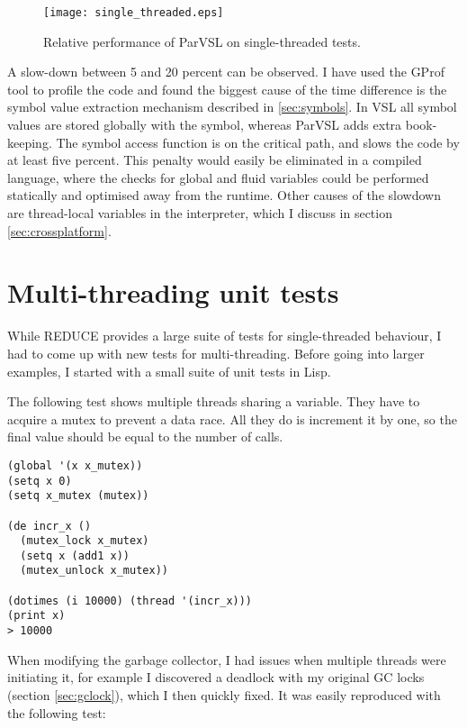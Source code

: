 \begin{figure}[h]
  \centering
  \texttt{[image: single\_threaded.eps]}
  \caption{Relative performance of ParVSL on single-threaded tests.}
  \label{fig:single-threaded}
\end{figure}


A slow-down between 5 and 20 percent can be observed. I have used the GProf \cite{gprof}
tool to profile the code and found the biggest cause of the time difference is the
symbol value extraction mechanism described in \ref{sec:symbols}. In VSL all symbol
values are stored globally with the symbol, whereas ParVSL adds extra book-keeping.
The symbol access function is on the critical path, and slows the code by at least
five percent. This penalty would easily be eliminated in a compiled language, where the
checks for global and fluid variables could be performed statically and optimised away
from the runtime. Other causes of the slowdown are thread-local variables in the interpreter,
which I discuss in section \ref{sec:crossplatform}.

\section{Multi-threading unit tests}

While REDUCE provides a large suite of tests for single-threaded behaviour, I had to come
up with new tests for multi-threading. Before going into larger examples, I started with a small
suite of unit tests in Lisp.

The following test shows multiple threads sharing a variable. They have to acquire
a mutex to prevent a data race. All they do is increment it by one, so the final
value should be equal to the number of calls.

\label{lst:shared-global}
\begin{verbatim}
(global '(x x_mutex))
(setq x 0)
(setq x_mutex (mutex))

(de incr_x ()
  (mutex_lock x_mutex)
  (setq x (add1 x))
  (mutex_unlock x_mutex))

(dotimes (i 10000) (thread '(incr_x)))
(print x)
> 10000
\end{verbatim}

When modifying the garbage collector, I had issues when multiple
threads were initiating it, for example I discovered a deadlock
with my original GC locks (section \ref{sec:gclock}), which I then
quickly fixed. It was easily reproduced with the following test:

